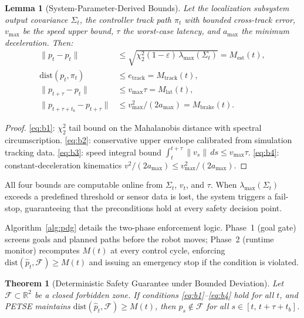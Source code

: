 \documentclass[conference]{IEEEtran}
\newtheorem{lemma}{Lemma}
\newtheorem{theorem}{Theorem}
\begin{document}
\begin{lemma}[System-Parameter-Derived Bounds]\label{lem:bounds}
Let the localization subsystem output covariance $\Sigma_t$, the controller track path $\pi_t$ with bounded cross-track error, $v_{\max}$ be the speed upper bound, $\tau$ the worst-case latency, and $a_{\max}$ the minimum deceleration. Then:
\begin{align}
\|p_t - \hat{p}_t\| &\le \sqrt{\chi^2_2(1{-}\varepsilon)\,\lambda_{\max}(\Sigma_t)} = M_{\mathrm{est}}(t), \label{eq:b1}\\
\mathrm{dist}(p_t, \pi_t) &\le e_{\mathrm{track}} = M_{\mathrm{track}}(t), \label{eq:b2}\\
\|p_{t+\tau} - p_t\| &\le v_{\max}\tau = M_{\mathrm{lat}}(t), \label{eq:b3}\\
\|p_{t+\tau+t_b} - p_{t+\tau}\| &\le v_{\max}^2/(2a_{\max}) = M_{\mathrm{brake}}(t). \label{eq:b4}
\end{align}
\end{lemma}
\begin{proof}
\eqref{eq:b1}: $\chi^2_2$ tail bound on the Mahalanobis distance with spectral circumscription. \eqref{eq:b2}: conservative upper envelope calibrated from simulation tracking data. \eqref{eq:b3}: speed integral bound $\int_t^{t+\tau}\|v_s\|\,ds \le v_{\max}\tau$. \eqref{eq:b4}: constant-deceleration kinematics $v^2/(2a_{\max}) \le v_{\max}^2/(2a_{\max})$.
\end{proof}

All four bounds are computable online from $\Sigma_t$, $v_t$, and $\tau$. When $\lambda_{\max}(\Sigma_t)$ exceeds a predefined threshold or sensor data is lost, the system triggers a fail-stop, guaranteeing that the preconditions hold at every safety decision point.

Algorithm~\ref{alg:pdg} details the two-phase enforcement logic. Phase~1 (goal gate) screens goals and planned paths before the robot moves; Phase~2 (runtime monitor) recomputes $M(t)$ at every control cycle, enforcing $\mathrm{dist}(\hat{p}_t, \mathcal{F}) \ge M(t)$ and issuing an emergency stop if the condition is violated.

\begin{theorem}[Deterministic Safety Guarantee under Bounded Deviation]
Let $\mathcal{F}\subset\mathbb{R}^2$ be a closed forbidden zone. If conditions \eqref{eq:b1}--\eqref{eq:b4} hold for all $t$, and PETSE maintains $\mathrm{dist}(\hat{p}_t, \mathcal{F}) \ge M(t)$, then $p_s \notin \mathcal{F}$ for all $s \in [t,\, t{+}\tau{+}t_b]$.
\end{theorem}
\end{document}
